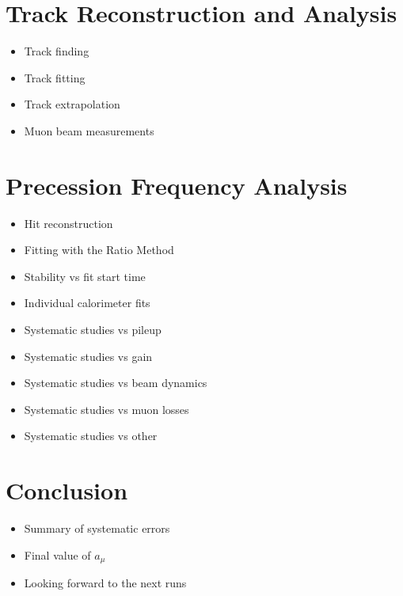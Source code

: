 \documentclass[12pt,letterpaper]{article}
\begin{document}
\section{Track Reconstruction and Analysis}

\begin{itemize}
	\item{Track finding}
	\item{Track fitting}
	\item{Track extrapolation}
	\item{Muon beam measurements}
\end{itemize}

\section{Precession Frequency Analysis}

\begin{itemize}
	\item{Hit reconstruction}
	\item{Fitting with the Ratio Method}
	\item{Stability vs fit start time}
	\item{Individual calorimeter fits}
	\item{Systematic studies vs pileup} 
	\item{Systematic studies vs gain}
	\item{Systematic studies vs beam dynamics} 
 	\item{Systematic studies vs muon losses} 
	\item{Systematic studies vs other} 
\end{itemize}

\section{Conclusion}

\begin{itemize}
	\item{Summary of systematic errors}
	\item{Final value of $a_{\mu}$}
	\item{Looking forward to the next runs}
\end{itemize}
\end{document}
